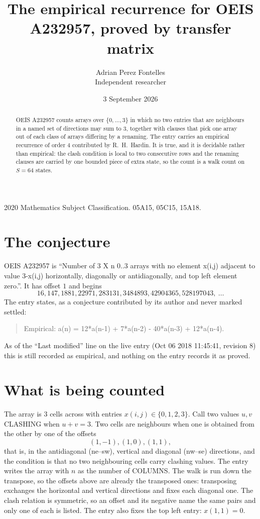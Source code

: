 \documentclass[11pt,a4paper]{article}
\title{The empirical recurrence for OEIS A232957, proved by transfer matrix}
\author{Adrian Perez Fontelles\\ \small Independent researcher}
\date{3 September 2026}
\theoremstyle{plain}
\theoremstyle{definition}
\begin{document}
\maketitle

\begin{abstract}
OEIS A232957 counts arrays over $\{0,\dots,3\}$ in which no two entries that are neighbours in
a named set of directions may sum to $3$, together with clauses that pick one array out of
each class of arrays differing by a renaming. The entry carries an empirical recurrence of
order $4$ contributed by R.~H.~Hardin. It is true, and it is decidable rather than
empirical: the clash condition is local to two consecutive rows and the renaming clauses are
carried by one bounded piece of extra state, so the count is a walk count on $S=64$ states.
\end{abstract}

\noindent\small 2020 Mathematics Subject Classification. 05A15, 05C15, 15A18.\normalsize

\section{The conjecture}

OEIS A232957 is ``Number of 3 X n 0..3 arrays with no element x(i,j) adjacent to value 3-x(i,j) horizontally, diagonally or antidiagonally, and top left element zero.''. It has offset $1$ and begins
\[
16, 147, 1881, 22971, 283131, 3484893, 42904365, 528197043,\ \dots
\]
The entry states, as a conjecture contributed by its author and never marked settled:
\begin{quote}
Empirical: a(n) = 12*a(n-1) + 7*a(n-2) - 40*a(n-3) + 12*a(n-4).
\end{quote}
As of the ``Last modified'' line on the live entry (Oct 06 2018 11:45:41, revision 8) this is still
recorded as empirical, and nothing on the entry records it as proved.

\section{What is being counted}

The array is $3$ cells across with entries $x(i,j)\in\{0,1,2,3\}$. Call two values $u,v$ CLASHING
when $u+v=3$. Two cells are neighbours when one is obtained from the other by one of
the offsets
\[
(1,-1), (1,0), (1,1),
\]
that is, in the antidiagonal (ne--sw), vertical and diagonal (nw--se) directions, and the condition is that no two neighbouring cells carry
clashing values. The entry writes the array with $n$ as the number of COLUMNS. The walk is run down the transpose, so the offsets above are already the transposed ones: transposing exchanges the horizontal and vertical directions and fixes each diagonal one. The clash relation is symmetric, so an offset and its negative name the
same pairs and only one of each is listed. The entry also fixes the top left entry: $x(1,1)=0$.
\end{document}
